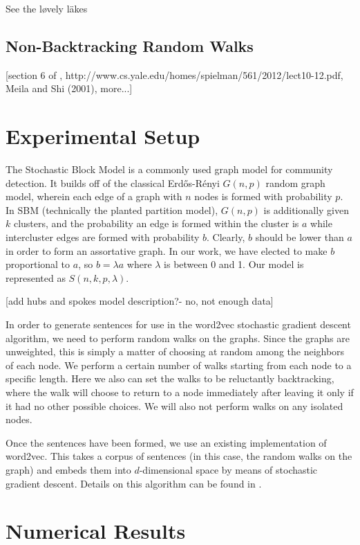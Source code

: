 \documentclass{article}
\begin{document}
See the l\o vely l{\"a}kes

\subsection{Non-Backtracking Random Walks}

[section 6 of \cite{Luxburg},
http://www.cs.yale.edu/homes/spielman/561/2012/lect10-12.pdf, Meila and Shi
(2001), more...]

\section{Experimental Setup}

The Stochastic Block Model is a commonly used graph model for community
detection. It builds off of the classical Erdős-Rényi $G(n,p)$ random graph
model, wherein each edge of a graph with $n$ nodes is formed with probability
$p$. In SBM (technically the planted partition model), $G(n,p)$ is additionally
given $k$ clusters, and the probability an edge is formed within the cluster is
$a$ while intercluster edges are formed with probability $b$. Clearly, $b$
should be lower than $a$ in order to form an assortative graph. In our work, we
have elected to make $b$ proportional to $a$, so $b = \lambda a$ where $\lambda$
is between 0 and 1. Our model is represented as $S(n,k,p,\lambda)$.

[add hubs and spokes model description?- no, not enough data]

In order to generate sentences for use in the word2vec stochastic gradient
descent algorithm, we need to perform random walks on the graphs. Since the
graphs are unweighted, this is simply a matter of choosing at random among the
neighbors of each node. We perform a certain number of walks starting from each
node to a specific length. Here we also can set the walks to be reluctantly
backtracking, where the walk will choose to return to a node immediately after
leaving it only if it had no other possible choices. We will also not perform
walks on any isolated nodes.

Once the sentences have been formed, we use an existing implementation of
word2vec\cite{word2vec}. This takes a corpus of sentences (in this case, the
random walks on the graph) and embeds them into $d$-dimensional space by means
of stochastic gradient descent. Details on this algorithm can be found in
\cite{word2vec}.



\section{Numerical Results}
\end{document}
